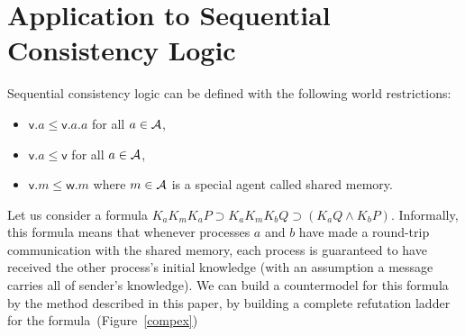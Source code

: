  \section{Application to Sequential Consistency Logic}

  Sequential consistency logic can be defined with the following world
  restrictions:
  \begin{itemize}
   \item $\mathsf v.a\le\mathsf v.a.a$ for all $a\in\mathcal A$,
   \item $\mathsf v.a\le\mathsf v$ for all $a\in\mathcal A$,
   \item $\mathsf v.m\le\mathsf w.m$ where $m\in\mathcal A$ is a special
	 agent called shared memory.
  \end{itemize}

  Let us consider a formula $K_a K_m K_a P\supset K_a K_m K_b Q\supset
  (K_a Q\wedge K_b P)$.
  Informally, this formula means that whenever processes $a$ and $b$ have
  made a round-trip communication with the shared memory, each process is
  guaranteed to have received the other process's initial knowledge (with
  an assumption a message carries all of sender's knowledge).
  We can build a countermodel for this formula by the method described in
  this paper, by building
  a complete refutation ladder for the formula~(Figure~\ref{compex})
